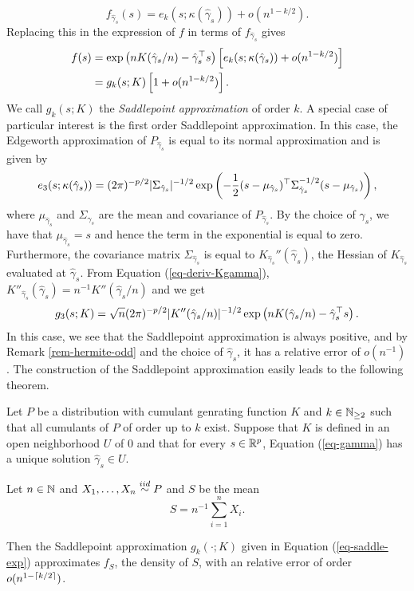 \begin{equation*}
    f_{\hat\gamma_s}(s) = e_k(s; \kappa(\hat\gamma_s)) + o(n^{1-k/2}).
\end{equation*}
Replacing this in the expression of $f$ in terms of $f_{\hat\gamma_s}$ gives
\begin{align}
    f(s) &= \exp\left(nK(\hat\gamma_s / n) - \hat\gamma_s^\top s\right)\left[e_k(s; \kappa(\hat\gamma_s)) + o(n^{1-k/2})\right]\nonumber\\
    &= g_k(s; K)\left[1 + o(n^{1-k/2})\right]. \label{eq-saddle-exp}
\end{align}
We call $g_k(s; K)$ the \textit{Saddlepoint approximation} of order $k$. A special case of particular interest is the first order Saddlepoint approximation. In this case, the Edgeworth approximation of $P_{\hat\gamma_s}$ is equal to its normal approximation and is given by
\begin{equation*}
    e_3(s; \kappa(\hat\gamma_s)) = (2\pi)^{-p/2}|\Sigma_{\hat\gamma_s}|^{-1/2}\exp\left(-\frac{1}{2}(s - \mu_{\hat\gamma_s})^\top \Sigma_{\hat\gamma_s}^{-1/2}(s - \mu_{\hat\gamma_s}) \right),
\end{equation*}
where $\mu_{\hat\gamma_s}$ and $\Sigma_{\hat\gamma_s}$ are the mean and covariance of $P_{\hat\gamma_s}$. By the choice of $\hat\gamma_s$, we have that $\mu_{\hat\gamma_s} = s$ and hence the term in the exponential is equal to zero. Furthermore, the covariance matrix $\Sigma_{\hat\gamma_s}$ is equal to $K_{\hat\gamma_s}''(\hat\gamma_s)$, the Hessian of $K_{\hat\gamma_s}$ evaluated at $\hat\gamma_s$. From Equation (\ref{eq-deriv-Kgamma}), $K''_{\hat\gamma_s}(\hat\gamma_s) = n^{-1} K''(\hat\gamma_s/n)$ and we get 
\begin{equation*}
    g_3(s; K) = \sqrt{n} (2\pi)^{-p/2}|K''(\hat\gamma_s/n)|^{-1/2} \exp\left(nK(\hat\gamma_s / n) - \hat\gamma_s^\top s\right).
\end{equation*}
In this case, we see that the Saddlepoint approximation is always positive, and by Remark \ref{rem-hermite-odd} and the choice of $\hat\gamma_s$, it has a relative error of $o(n^{-1})$. The construction of the Saddlepoint approximation easily leads to the following theorem.

\begin{theorem}
    Let $P$ be a distribution with cumulant genrating function $K$ and $k \in \mathbb{N}_{\geq 2}$ such that all cumulants of $P$ of order up to $k$ exist. Suppose that $K$ is defined in an open neighborhood $U$ of 0 and that for every $s \in {\mathbb{R}^p}$, Equation (\ref{eq-gamma}) has a unique solution $\hat\gamma_s \in U$. 

    Let $n \in \mathbb{N}$ and $X_1, \ldots, X_n \stackrel{iid}{\sim} P$ and $S$ be the mean
    \begin{equation*}
        S = n^{-1} \sum_{i=1}^n X_i.
    \end{equation*}

    Then the Saddlepoint approximation $g_k(\cdot; K)$ given in Equation (\ref{eq-saddle-exp}) approximates $f_S$, the density of $S$, with an relative error of order $o(n^{1-\lceil k/2\rceil})$.
\end{theorem}

